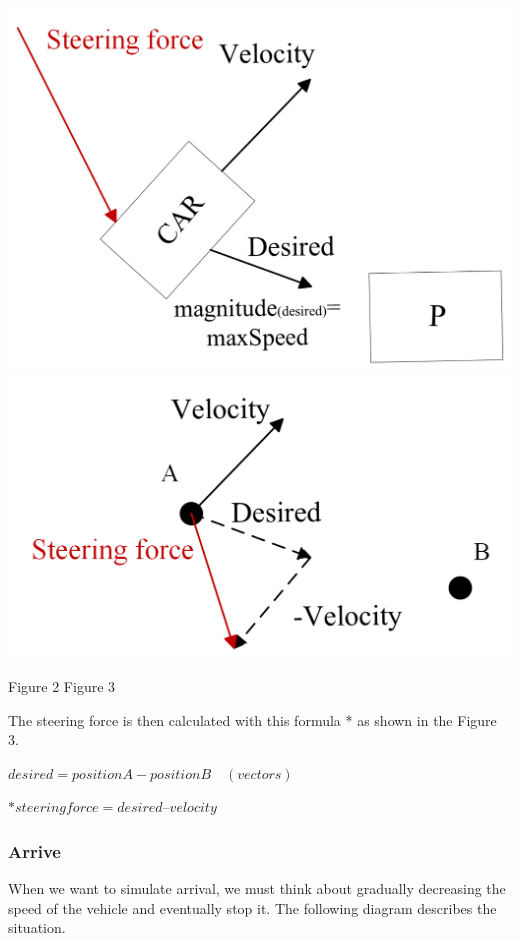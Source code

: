 \documentclass[10pt,twoside,english,a4paper]{article}
\begin{document}
\includegraphics[scale=0.25]{diagram_car.png} 	\includegraphics[scale=0.25]{diagram_steeringForce.png}\par
\quad Figure 2 
\hspace*{\fill} Figure 3
\bigbreak

The steering force is then calculated with this formula * as shown in the Figure 3.

\begin{center}
$desired =position A - position B \quad (vectors)$ \par
$ *steering force= desired – velocity$

\end{center}

\subsubsection{Arrive} \label{arrive}

When we want to simulate arrival, we must think about gradually decreasing the speed of the vehicle and eventually stop it. The following diagram describes the situation.
\end{document}
